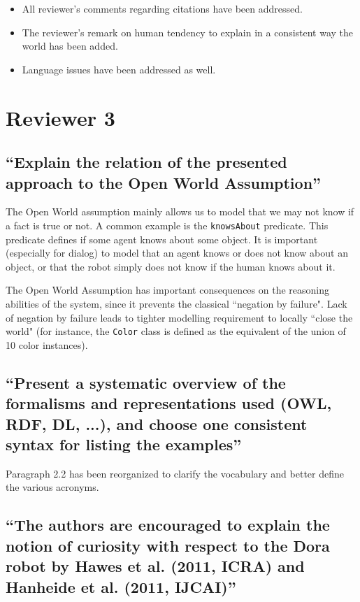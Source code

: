 \documentclass[11pt]{article}
\begin{document}
\begin{itemize}
\item All reviewer's comments regarding citations have been addressed.
\item The reviewer's remark on human tendency to explain in a consistent way the world has been added.
\item Language issues have been addressed as well.
\end{itemize}

\section{Reviewer 3}

\subsection{``Explain the relation of the presented approach to the Open World
Assumption''}

The Open World assumption mainly allows us to model that we may not know if a
fact is true or not. A common example is the {\tt knowsAbout} predicate. This
predicate defines if some agent knows about some object. It is important
(especially for dialog) to model that an agent knows or  does not know about an
object, or that the robot simply does not know if the human knows about it.

The Open World Assumption has important consequences on the reasoning
abilities of the system, since it prevents the classical ``negation by 
failure". Lack of negation by failure leads to tighter modelling requirement to locally ``close the
world" (for instance, the {\tt Color} class is defined as the equivalent of
the union of 10 color instances).

\subsection{``Present a systematic overview of the formalisms and
representations used (OWL, RDF, DL, ...), and choose one consistent syntax for
listing the examples''}

Paragraph 2.2 has been reorganized to clarify the vocabulary and better
define the various acronyms.

\subsection{``The authors are encouraged to explain the notion of curiosity
with respect to the Dora robot by Hawes et al. (2011, ICRA) and Hanheide et al.
(2011, IJCAI)''}
\end{document}
